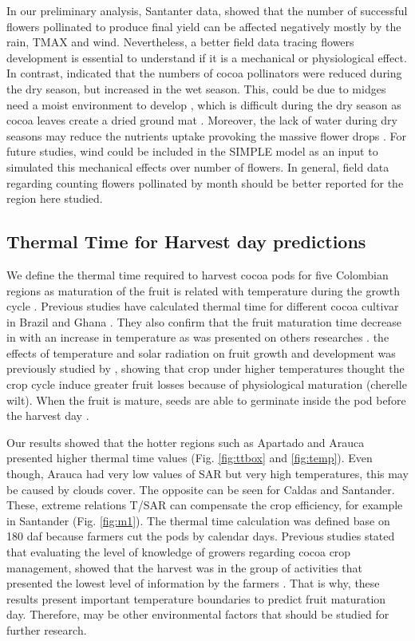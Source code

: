 \documentclass[gene,journal,article,submit,moreauthors,pdftex]{Definitions/mdpi}
\begin{document}
In our preliminary analysis, Santanter data, showed that the number of successful flowers pollinated to produce final yield can be affected negatively mostly by the rain, TMAX and wind. Nevertheless, a better field data tracing flowers development is essential to understand if it is a mechanical or physiological effect. In contrast,  \cite{Frimpong2009, Frimpong2011} indicated that the numbers of cocoa pollinators were reduced during the dry season, but increased in the wet season. This, could be due to midges need a moist environment to develop \citep{Frimpong2014}, which is difficult during the dry season as cocoa leaves create a dried ground mat \citep{Frimpong2009, Frimpong2014}. Moreover, the lack of water during dry seasons may reduce the nutrients uptake provoking the massive flower drops \citep{Vaughton2017}.  For future studies, wind could be included in the SIMPLE model as an input to simulated this mechanical effects over number of flowers. In general, field data regarding counting flowers pollinated by month should be better reported for the region here studied. 

\subsection{Thermal Time for Harvest day predictions}
We define the thermal time required to harvest cocoa pods for five Colombian regions as maturation of the fruit is related with temperature during the growth cycle \citep{lopez2018}. Previous studies have calculated thermal time for  different cocoa cultivar in Brazil and Ghana \cite{Daymond2008}. They also confirm that the fruit maturation time decrease in with an increase in temperature as was presented on others researches \citep{Alvim1974, End1991, Daymond2008}. the effects of temperature and solar radiation on fruit growth and development was previously studied by \cite{Daymond2008}, showing that crop under higher temperatures thought the crop cycle induce greater fruit losses because of physiological maturation (cherelle wilt). When the fruit is mature, seeds are able to germinate inside the pod before the harvest day \citep{lopez2018}.

Our results showed that the hotter regions such as Apartado and Arauca presented higher thermal time values (Fig. \ref{fig:ttbox} and \ref{fig:temp}). Even though, Arauca had very low values of SAR but very high temperatures, this may be caused by clouds cover. The opposite can be seen for Caldas and Santander. These, extreme relations T/SAR can compensate the crop efficiency, for example in Santander (Fig. \ref{fig:m1}).  The thermal time calculation was defined base on  180 daf because farmers cut the pods by calendar days. Previous studies stated that evaluating the level of knowledge of growers regarding cocoa crop management, showed that the harvest was in the group of activities that presented the lowest level of information by the farmers \citep{Gutierrez2020}. That is why, these results present important temperature boundaries to predict fruit maturation day. Therefore, may be other environmental factors that should be studied for further research. 
\end{document}
